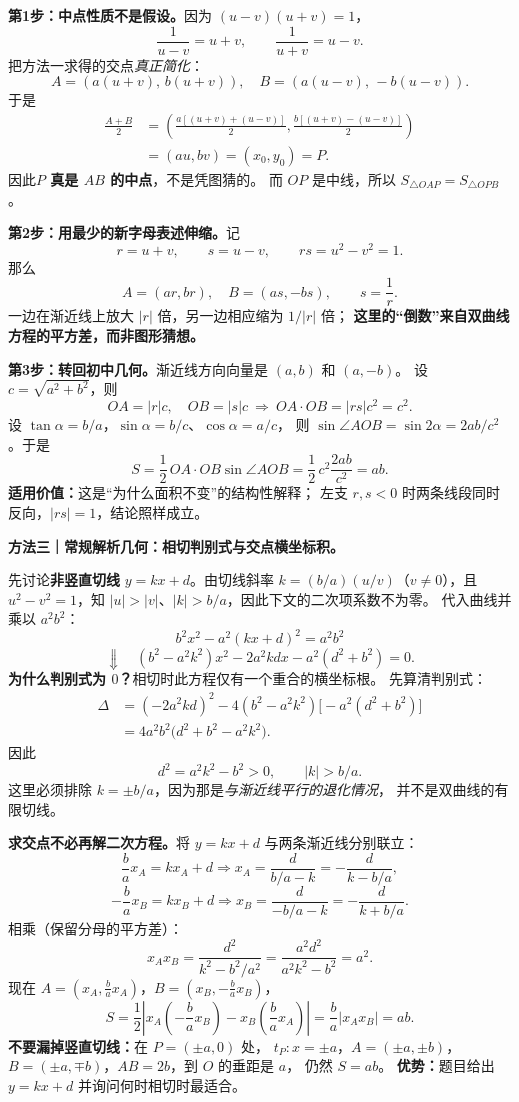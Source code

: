 \begin{proofbox}
\textbf{第1步：中点性质不是假设。}因为
$(u-v)(u+v)=1$，
\[
\frac1{u-v}=u+v,\qquad\frac1{u+v}=u-v.
\]
把方法一求得的交点\emph{真正简化}：
\[
A=(a(u+v),\,b(u+v)),\quad
B=(a(u-v),\,-b(u-v)).
\]
于是
\[
\begin{aligned}
\frac{A+B}{2}
&=\left(\frac{a[(u+v)+(u-v)]}{2},
          \frac{b[(u+v)-(u-v)]}{2}\right)\\
&=(au,bv)=(x_0,y_0)=P.
\end{aligned}
\]
因此\textbf{$P$ 真是 $AB$ 的中点}，不是凭图猜的。
而 $OP$ 是中线，所以 $S_{\triangle OAP}=S_{\triangle OPB}$。

\textbf{第2步：用最少的新字母表述伸缩。}记
\[
r=u+v,\qquad s=u-v,\qquad rs=u^2-v^2=1.
\]
那么
\[
A=(ar,br),\quad B=(as,-bs),\qquad s=\frac1r.
\]
一边在渐近线上放大 $|r|$ 倍，另一边相应缩为 $1/|r|$ 倍；
\textbf{这里的``倒数''来自双曲线方程的平方差，而非图形猜想。}

\textbf{第3步：转回初中几何。}渐近线方向向量是 $(a,b)$ 和 $(a,-b)$。
设 $c=\sqrt{a^2+b^2}$，则
\[
OA=|r|c,\quad OB=|s|c\ \Rightarrow\ OA\cdot OB=|rs|c^2=c^2.
\]
设 $\tan\alpha=b/a$，$\sin\alpha=b/c$、$\cos\alpha=a/c$，
则 $\sin\angle AOB=\sin2\alpha=2ab/c^2$。于是
\[
S=\frac12\,OA\cdot OB\sin\angle AOB
=\frac12\,c^2\frac{2ab}{c^2}=\boxed{ab}.
\]
\textbf{适用价值：}这是``为什么面积不变''的结构性解释；
左支 $r,s<0$ 时两条线段同时反向，$|rs|=1$，结论照样成立。

\medskip
\textbf{方法三｜常规解析几何：相切判别式与交点横坐标积。}
\begin{center}

\end{center}

先讨论\textbf{非竖直切线} $y=kx+d$。由切线斜率
$k=(b/a)(u/v)$（$v\ne0$），且 $u^2-v^2=1$，知
$|u|>|v|$、$|k|>b/a$，因此下文的二次项系数不为零。
代入曲线并乘以 $a^2b^2$：
\[
b^2x^2-a^2(kx+d)^2=a^2b^2
\]
\[
\Downarrow\quad
(b^2-a^2k^2)x^2-2a^2kdx-a^2(d^2+b^2)=0.
\]
\textbf{为什么判别式为 $0$？}相切时此方程仅有一个重合的横坐标根。
先算清判别式：
\[
\begin{aligned}
\Delta
&=(-2a^2kd)^2
-4(b^2-a^2k^2)\bigl[-a^2(d^2+b^2)\bigr]\\
&=4a^2b^2\bigl(d^2+b^2-a^2k^2\bigr).
\end{aligned}
\]
因此
\[
\boxed{d^2=a^2k^2-b^2>0},\qquad |k|>b/a.
\]
这里必须排除 $k=\pm b/a$，因为那是\emph{与渐近线平行的退化情况}，
并不是双曲线的有限切线。

\textbf{求交点不必再解二次方程。}将 $y=kx+d$ 与两条渐近线分别联立：
\[
\frac ba x_A=kx_A+d
\Rightarrow x_A=\frac{d}{b/a-k}=-\frac d{k-b/a},
\]
\[
-\frac ba x_B=kx_B+d
\Rightarrow x_B=\frac d{-b/a-k}=-\frac d{k+b/a}.
\]
相乘（保留分母的平方差）：
\[
x_Ax_B=\frac{d^2}{k^2-b^2/a^2}
=\frac{a^2d^2}{a^2k^2-b^2}=\boxed{a^2}.
\]
现在 $A=(x_A,\frac ba x_A)$，$B=(x_B,-\frac ba x_B)$，
\[
S=\frac12\left|x_A\left(-\frac ba x_B\right)
-x_B\left(\frac ba x_A\right)\right|
=\frac ba|x_Ax_B|=\boxed{ab}.
\]
\textbf{不要漏掉竖直切线：}在 $P=(\pm a,0)$ 处，
$t_P:x=\pm a$，$A=(\pm a,\pm b)$，
$B=(\pm a,\mp b)$，$AB=2b$，到 $O$ 的垂距是 $a$，
仍然 $S=ab$。
\textbf{优势：}题目给出 $y=kx+d$ 并询问何时相切时最适合。


\end{proofbox}
